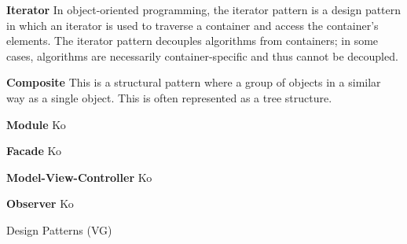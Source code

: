 \documentclass{article}
\begin{document}
\begin{Parallel}[v]{0.48\textwidth}{0.48\textwidth}
{        \textbf{Iterator}\newline
        In object-oriented programming, the iterator pattern is a
        design pattern in which an iterator is used to traverse a
        container and access the container's elements.
        The iterator pattern decouples algorithms from containers;
        in some cases, algorithms are necessarily container-specific
        and thus cannot be decoupled.

        \textbf{Composite}\newline
        This is a structural pattern where a group of objects in a similar way as a
        single object. This is often represented as a tree structure.

        \textbf{Module}\newline
        Ko

        \textbf{Facade}\newline
        Ko

        \textbf{Model-View-Controller}\newline
        Ko

        \textbf{Observer}\newline
        Ko
    }
    \ParallelPar
\end{Parallel}
\newpage


\begin{center}
    {\huge Design Patterns (VG)}
\end{center}
\begin{Parallel}[v]{0.48\textwidth}{0.48\textwidth}
    \ParallelPar
\end{Parallel}
\end{document}
